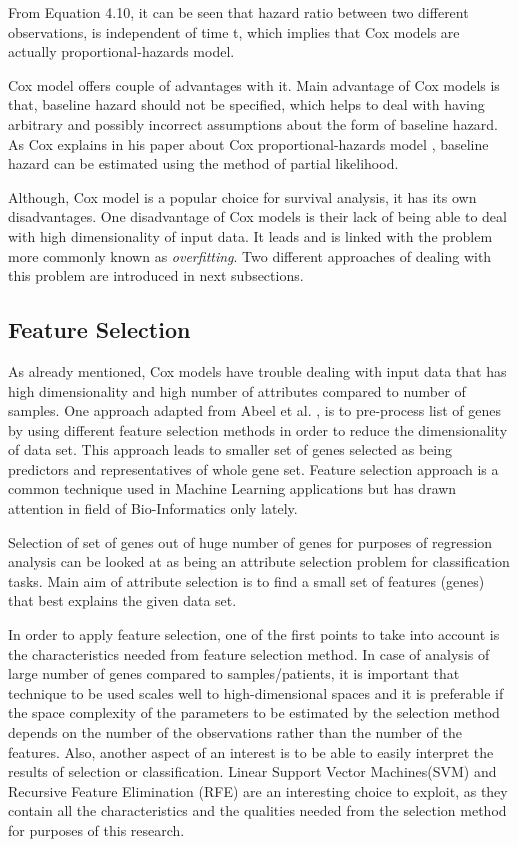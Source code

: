 \documentclass{ba-kecs}
\numberwithin{figure}{section}
\numberwithin{equation}{section}
\begin{document}
From Equation 4.10, it can be seen that hazard ratio between two different observations, is independent of time t, which implies that Cox models are actually proportional-hazards model.

Cox model offers couple of advantages with it. Main advantage of Cox models is that, baseline hazard should not be specified, which helps to deal with having arbitrary and possibly incorrect assumptions about the form of baseline hazard. As Cox explains in his paper about Cox proportional-hazards model \cite{coxoriginal}, baseline hazard can be estimated using the method of partial likelihood.

Although, Cox model is a popular choice for survival analysis, it has its own disadvantages. One disadvantage of Cox models is their lack of being able to deal with high dimensionality of input data. It leads and is linked with the problem more commonly known as \textit{overfitting}. Two different approaches of dealing with this problem are introduced in next subsections.

\subsection{Feature Selection}
As already mentioned, Cox models have trouble dealing with input data that has high dimensionality and high number of attributes compared to number of samples. One approach adapted from Abeel et al. \cite{bootstrapping}, is to pre-process list of genes by using different feature selection methods in order to reduce the dimensionality of data set. This approach leads to smaller set of genes selected as being predictors and representatives of whole gene set. Feature selection approach is a common technique used in Machine Learning applications but has drawn attention in field of Bio-Informatics only lately.

Selection of set of genes out of huge number of genes for purposes of regression analysis can be looked at as being an attribute selection problem for classification tasks. Main aim of attribute selection is to find a small set of features (genes) that best explains the given data set.

In order to apply feature selection, one of the first points to take into account is the characteristics needed from feature selection method. In case of analysis of large number of genes compared to samples/patients, it is important that technique to be used scales well to high-dimensional spaces and it is preferable if the space complexity of the parameters to be estimated by the selection method depends on the number of the observations rather than the number of the features. Also, another aspect of an interest is to be able to easily interpret the results of selection or classification. Linear Support Vector Machines(SVM) and Recursive Feature Elimination (RFE) are an interesting choice to exploit, as they contain all the characteristics and the qualities needed from the selection method for purposes of this research.
\end{document}
